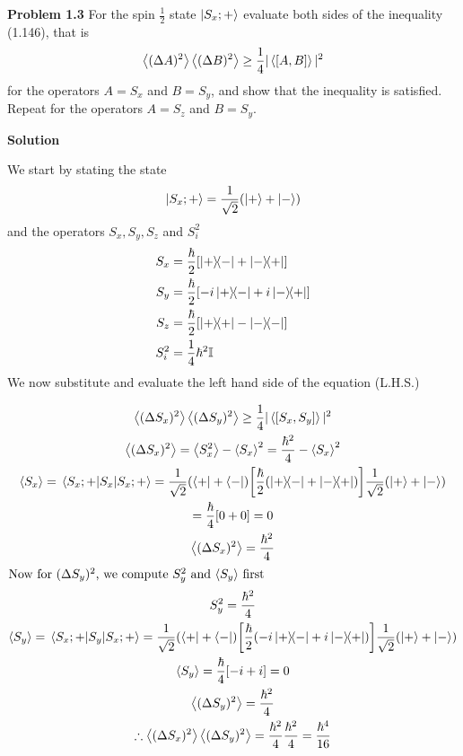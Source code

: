 \item \textbf{Problem 1.3} 
For the spin $\frac12$ state $\ket{S_x;+}$ evaluate both sides of the inequality (1.146), that is
$$ \ev{(\Delta A)^2} \ev{(\Delta B)^2} \geq \frac14 |\ev{\comm{A}{B}}|^2$$ 
for the operators $A = S_x$ and $B = S_y$, and show that the inequality is satisfied. Repeat for the operators $A = S_z$ and $B = S_y$.

\vspace{1cm}
\textbf{Solution}

We start by stating the state $$\ket{S_x;+} = \frac{1}{\sqrt{2}} \qty(\ket + + \ket -)$$ and the operators $S_x,S_y,S_z$ and $S_i^2$
\begin{align*}
    S_x &= \frac{\hbar}{2} \qty[\op{+}{-} + \ketbra{-}{+}]\\
    S_y &= \frac{\hbar}{2} \qty[-i\op{+}{-} + i\ketbra{-}{+}]\\
    S_z &= \frac{\hbar}{2} \qty[\op{+}{+} - \ketbra{-}]\\
    S_i^2 &= \frac14 \hbar^2\mathbb{I}
\end{align*}
We now substitute and evaluate the left hand side of the equation (L.H.S.)

\begin{gather*}
    \ev{(\Delta S_x)^2}\ev{(\Delta S_y)^2} \ge \frac{1}{4} | \ev{\comm{S_x}{S_y}} |^2\\
    \ev{(\Delta S_x)^2} = \ev{S_x^2} - \ev{S_x}^2 = \frac{\hbar^2}{4} - \ev{S_x}^2\\
    \ev{S_x} = \ev{S_x}{S_x;+} = \frac{1}{\sqrt{2}} \qty(\bra + + \bra -) \qty[\frac{\hbar}{2} \qty(\op{+}{-} + \ketbra{-}{+})]\frac{1}{\sqrt{2}} \qty(\ket + + \ket -)\\
     = \frac\hbar4 \qty[0 + 0] = 0\\
    \ev{(\Delta S_x)^2} = \frac{\hbar^2}{4}\\
    \intertext{Now for $(\Delta S_y)^2$, we compute $S_y^2$ and $\ev{S_y}$ first}
    S_y^2 = \frac{\hbar^2}{4}\\
    \ev{S_y} = \ev{S_y}{S_x;+} =  \frac{1}{\sqrt{2}} \qty(\bra + + \bra -) \qty[\frac{\hbar}{2} \qty(-i\op{+}{-} + i\ketbra{-}{+})]\frac{1}{\sqrt{2}} \qty(\ket + + \ket -)\\
    \ev{S_y}= \frac{\hbar}{4} \qty[-i+i] = 0 \\
    \ev{(\Delta S_y)^2} = \frac{\hbar^2}{4}\\
    \therefore \ev{(\Delta S_x)^2}\ev{(\Delta S_y)^2} = \frac{\hbar^2}{4}\frac{\hbar^2}{4} = \frac{\hbar^4}{16}
\end{gather*}


